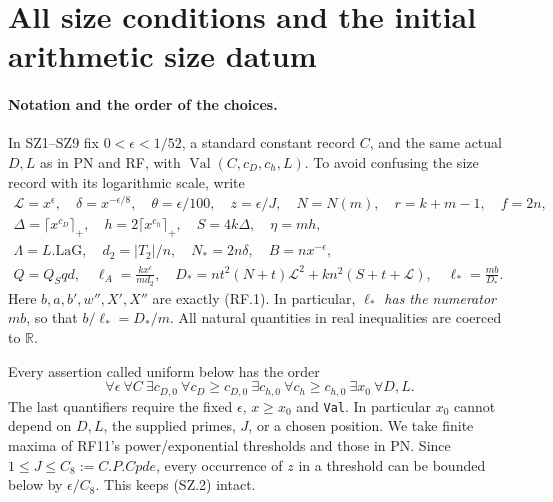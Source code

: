 \section{All size conditions and the initial arithmetic size datum}
\label{sec:size-conditions}


\paragraph{Notation and the order of the choices.}
In SZ1--SZ9 fix $0<\epsilon<1/52$, a standard constant record $C$,
and the same actual $D,L$ as in PN and RF, with
$\operatorname{Val}(C,c_D,c_h,L)$. To avoid confusing the size record
with its logarithmic scale, write
\[
 \begin{gathered}
 \mathcal L=x^\epsilon,\quad \delta=x^{-\epsilon/8},\quad
 \theta=\epsilon/100,\quad z=\epsilon/J,\quad
 N=N(m),\quad r=k+m-1,\quad f=2n,\\
 \Delta=\lceil x^{c_D}\rceil_+,\quad
 h=2\lceil x^{c_h}\rceil_+,\quad S=4k\Delta,\quad \eta=mh,\\
 \Lambda=L.\mathrm{LaG},\quad d_2=|T_2|/n,\quad
 N_* =2n\delta,\quad B=n x^{-\epsilon},\\
 Q=Q_Sqd,\quad \ell_A=\frac{kx^\epsilon}{md_2},\quad
 D_*=nt^2(N+t)\mathcal L^2+kn^2(S+t+\mathcal L),\quad
 \ell_* =\frac{mb}{D_*}.
 \end{gathered}                                                   \tag{SZ.1}
\]
Here $b,a,b',w'',X',X''$ are exactly (RF.1). In particular,
\emph{$\ell_*$ has the numerator $mb$}, so that
$b/\ell_*=D_*/m$. All natural quantities in real inequalities are
coerced to $\mathbb R$.

Every assertion called uniform below has the order
\[
 \forall\epsilon\ \forall C\ \exists c_{D,0}\
 \forall c_D\geq c_{D,0}\ \exists c_{h,0}\
 \forall c_h\geq c_{h,0}\ \exists x_0\
 \forall D,L.                                                    \tag{SZ.2}
\]
The last quantifiers require the fixed $\epsilon$, $x\geq x_0$ and
\texttt{Val}. In particular $x_0$ cannot depend on $D,L$, the supplied
primes, $J$, or a chosen position. We take finite maxima of RF11's
power/exponential thresholds and those in PN. Since
$1\leq J\leq C_8:=C.P.Cpde$, every occurrence of $z$ in a threshold
can be bounded below by $\epsilon/C_8$. This keeps (SZ.2) intact.


